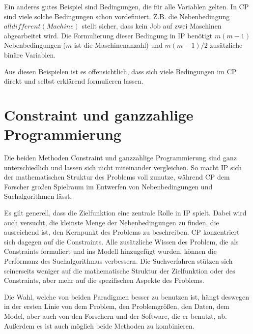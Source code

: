 Ein anderes gutes Beispiel sind Bedingungen, die für alle Variablen gelten. In CP sind viele solche Bedingungen schon vordefiniert. Z.B. die Nebenbedingung $alldifferent(Machine)$ stellt sicher, dass kein Job auf zwei Maschinen abgearbeitet wird. Die Formulierung dieser Bedingung in IP benötigt $m(m-1)$ Nebenbedingungen ($m$ ist die Maschinenanzahl) und $m(m-1)/2$ zusätzliche binäre Variablen.

Aus diesen Beispielen ist es offensichtlich, dass sich viele Bedingungen im CP direkt und selbst erklärend formulieren lassen.

\section{Constraint und ganzzahlige Programmierung}

Die beiden Methoden Constraint und  ganzzahlige Programmierung sind ganz unterschiedlich und lassen sich nicht miteinander vergleichen. 
So macht IP sich der mathematischen Struktur des Problems voll zunutze, während CP dem Forscher großen Spielraum im Entwerfen von Nebenbedingungen und Suchalgorithmen lässt.

Es gilt generell, dass die Zielfunktion eine zentrale Rolle in IP spielt. Dabei wird auch versucht, die kleinste Menge der Nebenbedingungen zu finden, die ausreichend ist, den Kernpunkt des Problems zu beschreiben. CP konzentriert sich dagegen auf die Constraints. Alle zusätzliche Wissen des Problem, die als Constraints formuliert und ins Modell hinzugefügt wurden, können die Performanz des Suchalgorithmus verbessern. Die Suchverfahren stützen sich seinerseits weniger auf die mathematische Struktur der Zielfunktion oder des Constraints, aber mehr auf die spezifischen Aspekte des Problems.

Die Wahl, welche von beiden Paradigmen besser zu benutzen ist, hängt deswegen in der ersten Linie von dem Problem, den Problemgrößen, den Daten, dem Model, aber auch von den Forschern und der Software, die er benutzt, ab. Außerdem es ist auch möglich beide Methoden zu kombinieren.



